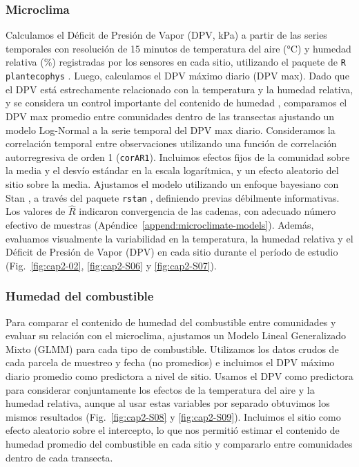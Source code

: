 \subsubsection{Microclima} 

Calculamos el Déficit de Presión de Vapor (DPV, kPa) a partir de las series temporales con resolución de 15 minutos de temperatura del aire (°C) y humedad relativa (\%) registradas por los sensores en cada sitio, utilizando el paquete de \texttt{R plantecophys} \citep{duursma_plantecophys-r_2015}. Luego, calculamos el DPV máximo diario (DPV max). Dado que el DPV está estrechamente relacionado con la temperatura y la humedad relativa, y se considera un control importante del contenido de humedad \citep{matthews_dead_2013, de_dios_semi-mechanistic_2015, brown_sensitivity_2022}, comparamos el DPV max promedio entre comunidades dentro de las transectas ajustando un modelo Log-Normal a la serie temporal del DPV max diario. Consideramos la correlación temporal entre observaciones utilizando una función de correlación autorregresiva de orden 1 (\texttt{corAR1}). Incluimos efectos fijos de la comunidad sobre la media y el desvío estándar en la escala logarítmica, y un efecto aleatorio del sitio sobre la media. Ajustamos el modelo utilizando un enfoque bayesiano con Stan \citep{carpenter_stan_2017}, a través del paquete \texttt{rstan} \citep{stan_development_team_rstan_2022}, definiendo previas débilmente informativas. Los valores de $\hat{R}$ indicaron convergencia de las cadenas, con adecuado número efectivo de muestras (Apéndice~\ref{append:microclimate-models}). Además, evaluamos visualmente la variabilidad en la temperatura, la humedad relativa y el Déficit de Presión de Vapor (DPV) en cada sitio durante el período de estudio (Fig.~\ref{fig:cap2-02}, \ref{fig:cap2-S06} y \ref{fig:cap2-S07}).

\subsubsection{Humedad del combustible}\label{cap2:humedad-methods}

Para comparar el contenido de humedad del combustible entre comunidades y evaluar su relación con el microclima, ajustamos un Modelo Lineal Generalizado Mixto (GLMM) para cada tipo de combustible. Utilizamos los datos crudos de cada parcela de muestreo y fecha (no promedios) e incluimos el DPV máximo diario promedio como predictora a nivel de sitio. Usamos el DPV como predictora para considerar conjuntamente los efectos de la temperatura del aire y la humedad relativa, aunque al usar estas variables por separado obtuvimos los mismos resultados (Fig.~\ref{fig:cap2-S08} y \ref{fig:cap2-S09}). Incluimos el sitio como efecto aleatorio sobre el intercepto, lo que nos permitió estimar el contenido de humedad promedio del combustible en cada sitio y compararlo entre comunidades dentro de cada transecta.

